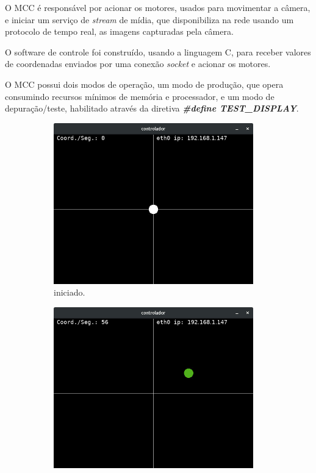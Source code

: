 O MCC é responsável por acionar os motores, usados para movimentar a câmera, e iniciar um serviço de \textit{stream} de mídia, que disponibiliza na rede usando um protocolo de tempo real, as imagens capturadas pela câmera.\par

O software de controle foi construído, usando a linguagem C, para receber valores de coordenadas enviados por uma conexão \textit{socket} e acionar os motores.\par

O MCC possui dois modos de operação, um modo de produção, que opera consumindo recursos mínimos de memória e processador, e um modo de depuração/teste, habilitado através da diretiva \textbf{\textit{\#define TEST\_DISPLAY}}.
\begin{figure}[H]
	\centering
	\begin{subfigure}{.5\textwidth}
		\includegraphics[width=0.95\textwidth]{figuras/controlador.jpg}
		\caption{iniciado.}
		\label{fig:controlador_teste}
	\end{subfigure}%
	\begin{subfigure}{.5\textwidth}
		\includegraphics[width=0.95\textwidth]{figuras/controlador2.jpg}

\end{subfigure}
\end{figure}

